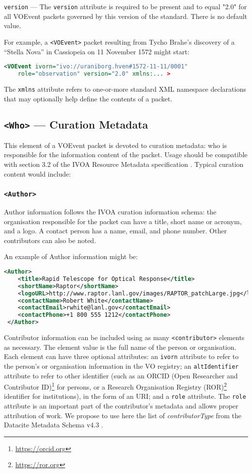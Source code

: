 \documentclass[11pt,a4paper]{ivoa}
\begin{document}
 {\tt version} \label{sec:3.1.3} ---
The {\tt version} attribute is required to be present and to equal "2.0" for
all VOEvent packets governed by this version of the standard. There is no
default value.

For example, a {\tt <VOEvent>} packet resulting from Tycho Brahe's discovery of
a ``Stella Nova'' in Cassiopeia on 11 November 1572 might start:
\begin{lstlisting}[language=XML]
<VOEvent ivorn="ivo://uraniborg.hven#1572-11-11/0001"
    role="observation" version="2.0" xmlns:... >
\end{lstlisting}

The {\tt xmlns} attribute refers to one-or-more standard XML namespace
declarations that may optionally help define the contents of a packet.

\subsection{{\tt <Who>} --- Curation Metadata}
\label{sec:3.2}
This element of a VOEvent packet is devoted to curation metadata: who is
responsible for the information content of the packet. Usage should be
compatible with section 3.2 of the IVOA Resource Metadata specification
\citep{2007ivoa.spec.0302H}. Typical curation content would include:

\subsubsection{\tt <Author>}
Author information follows the IVOA curation information schema: the
organisation responsible for the packet can have a title, short name or acronym,
and a logo. A contact person has a name, email, and phone number. Other
contributors can also be noted.

An example of Author information might be:
\begin{lstlisting}[language=XML]
<Author>
    <title>Rapid Telescope for Optical Response</title>
    <shortName>Raptor</shortName>
    <logoURL>http://www.raptor.lanl.gov/images/RAPTOR_patchLarge.jpg</logoURL>
    <contactName>Robert White</contactName>
    <contactEmail>rwhite@lanl.gov</contactEmail>
    <contactPhone>+1 800 555 1212</contactPhone>
 </Author>
\end{lstlisting}

Contributor information can be included using as many {\tt <contributor>}
elements as necessary. The element value is the full name of the person or
organisation. Each element can have three optional attributes: an {\tt ivorn}
attribute to refer to the person's or organisation information in the VO
registry; an {\tt altIdentifier} attribute to refer to other identifier (such
as an ORCID (Open Researcher and Contributor ID)\footnote{
\url{https://orcid.org}} for persons, or a Research Organisation Registry
(ROR)\footnote{\url{https://ror.org}} identifier for institutions), in the form
of an URI; and a {\tt role} attribute. The {\tt role} attribute is an important
part of the contributor's metadata and allows proper attribution of work. We
propose to use here the list of \emph{contributorType} from the Datacite
Metadata Schema v4.3 \citep{https://doi.org/10.14454/7xq3-zf69}.
\end{document}
